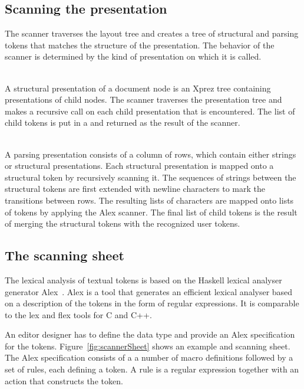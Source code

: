 \documentclass[12pt]{article}
\begin{document}
\subsection{Scanning the presentation}

The scanner traverses the layout tree and creates a tree of structural and parsing tokens that matches the structure of the presentation. The behavior of the scanner is determined by the kind of presentation on which it is called.


 \\
A structural presentation of a document node is an Xprez tree containing presentations of child nodes. The scanner traverses the presentation tree and makes a recursive call on each child presentation that is encountered. The list of child tokens is put in a  and returned as the result of the scanner.

 \\
A parsing presentation consists of a column of rows, which contain either strings or structural presentations. Each structural presentation is mapped onto a structural token by recursively scanning it. The sequences of strings between the structural tokens are first extended with newline characters to mark the transitions between rows. The resulting lists of characters are mapped onto lists of  tokens by applying the Alex scanner. The final list of child tokens is the result of merging the structural tokens with the recognized user tokens.



\subsection{The scanning sheet}

The lexical analysis of textual tokens is based on the Haskell lexical analyser generator Alex~\cite{marlow07alex}. Alex is a tool that generates an efficient lexical analyser based on a description of the tokens in the form of regular expressions. It is comparable to the lex and flex tools for C and C++.

An editor designer has to define the data type  and provide an Alex specification for the tokens. Figure~\ref{fig:scannerSheet} shows an example  and scanning sheet. The Alex specification consists of a a number of macro definitions followed by a set of rules, each defining a token. A rule is a regular expression together with an action that constructs the token.
\end{document}
